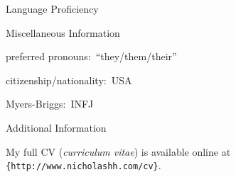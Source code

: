 \documentclass{resume}
\begin{document}
{\begin{rSection}{Language Proficiency}
  \end{rSection}





  \begin{rSection}{Miscellaneous Information}

  preferred pronouns:~``they/them/their''

  citizenship/nationality:~USA

  Myers-Briggs:~INFJ

  \end{rSection}





}{

  \begin{rSection}{Additional Information}


    My full CV (\emph{curriculum vitae}) is available online at \texttt{\{http://www.nicholashh.com/cv\}}.

  \end{rSection}

}
\end{document}
